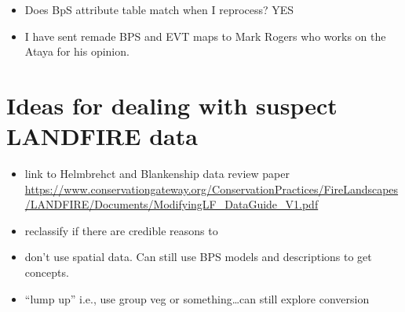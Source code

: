\documentclass[
]{book}
\providecommand{\tightlist}{%
  \setlength{\itemsep}{0pt}\setlength{\parskip}{0pt}}
\begin{document}
\begin{itemize}
\tightlist
\item
  Does BpS attribute table match when I reprocess? YES
\item
  I have sent remade BPS and EVT maps to Mark Rogers who works on the Ataya for his opinion.
\end{itemize}

\hypertarget{ideas-for-dealing-with-suspect-landfire-data}{%
\chapter{Ideas for dealing with suspect LANDFIRE data}\label{ideas-for-dealing-with-suspect-landfire-data}}

\begin{itemize}
\tightlist
\item
  link to Helmbrehct and Blankenship data review paper \url{https://www.conservationgateway.org/ConservationPractices/FireLandscapes/LANDFIRE/Documents/ModifyingLF_DataGuide_V1.pdf}
\item
  reclassify if there are credible reasons to
\item
  don't use spatial data. Can still use BPS models and descriptions to get concepts.
\item
  ``lump up'' i.e., use group veg or something\ldots can still explore conversion
\end{itemize}

  
\end{document}
